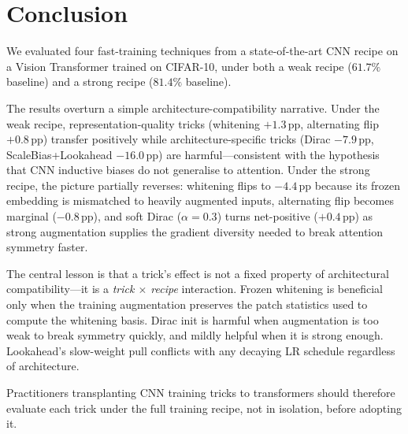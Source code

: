 \documentclass[10pt,twocolumn]{article}
\newcommand{\cifar}{CIFAR-10}
\newcommand{\pp}{\,pp}   %
\begin{document}
\section{Conclusion}\label{sec:conclusion}

We evaluated four fast-training techniques from a state-of-the-art CNN recipe on a Vision Transformer trained on \cifar{}, under both a weak recipe ($61.7\%$ baseline) and a strong recipe ($81.4\%$ baseline).

The results overturn a simple architecture-compatibility narrative.
Under the weak recipe, representation-quality tricks (whitening $+1.3$\pp{}, alternating flip $+0.8$\pp{}) transfer positively while architecture-specific tricks (Dirac $-7.9$\pp{}, ScaleBias+Lookahead $-16.0$\pp{}) are harmful---consistent with the hypothesis that CNN inductive biases do not generalise to attention.
Under the strong recipe, the picture partially reverses: whitening flips to $-4.4$\pp{} because its frozen embedding is mismatched to heavily augmented inputs, alternating flip becomes marginal ($-0.8$\pp{}), and soft Dirac ($\alpha{=}0.3$) turns net-positive ($+0.4$\pp{}) as strong augmentation supplies the gradient diversity needed to break attention symmetry faster.

The central lesson is that a trick's effect is not a fixed property of architectural compatibility---it is a \emph{trick $\times$ recipe} interaction.
Frozen whitening is beneficial only when the training augmentation preserves the patch statistics used to compute the whitening basis.
Dirac init is harmful when augmentation is too weak to break symmetry quickly, and mildly helpful when it is strong enough.
Lookahead's slow-weight pull conflicts with any decaying LR schedule regardless of architecture.

Practitioners transplanting CNN training tricks to transformers should therefore evaluate each trick under the full training recipe, not in isolation, before adopting it.



\end{document}

